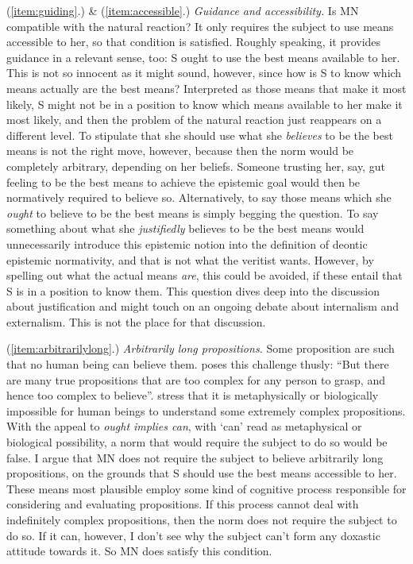 \documentclass[12pt,numbers=noenddot]{scrartcl}
\begin{document}
(\ref{item:guiding}.) \& (\ref{item:accessible}.) \emph{Guidance and accessibility.}
 Is MN compatible with the natural reaction? It only requires the subject to use means accessible to her, so that condition is satisfied. Roughly speaking, it provides guidance in a relevant sense, too: S ought to use the best means available to her. This is not so innocent as it might sound, however, since how is S to know which means actually are the best means? Interpreted as those means that make it most likely, S might not be in a position to know which means available to her make it most likely, and then the problem of the natural reaction just reappears on a different level. To stipulate that she should use what she \emph{believes} to be the best means is not the right move, however, because then the norm would be completely arbitrary, depending on her beliefs. Someone trusting her, say, gut feeling to be the best means to achieve the epistemic goal would then be normatively required to believe so. Alternatively, to say those means which she \emph{ought} to believe to be the best means is simply begging the question. To say something about what she \emph{justifiedly} believes to be the best means would unnecessarily introduce this epistemic notion into the definition of deontic epistemic normativity, and that is not what the veritist wants. However, by spelling out what the actual means \emph{are}, this could be avoided, if these entail that S is in a position to know them. This question dives deep into the discussion about justification and might touch on an ongoing debate about internalism and externalism. This is not the place for that discussion.

(\ref{item:arbitrarilylong}.) \emph{Arbitrarily long propositions.} 
Some proposition are such that no human being can believe them. \textcite[12]{Mchugh2012-MCHTTN} poses this challenge thusly: “But there are many true propositions that are too complex for any person to grasp, and hence too complex to believe”. \textcite[279]{Bykvist2007-BYKDTI} stress that it is metaphysically or biologically impossible for human beings to understand some extremely complex propositions. With the appeal to \emph{ought implies can}, with ‘can’ read as metaphysical or biological possibility, a norm that would require the subject to do so would be false. I argue that MN does not require the subject to believe arbitrarily long propositions, on the grounds that S should use the best means accessible to her. These means most plausible employ some kind of cognitive process responsible for considering and evaluating propositions. If this process cannot deal with indefinitely complex propositions, then the norm does not require the subject to do so. If it can, however, I don't see why the subject can't form any doxastic attitude towards it. So MN does satisfy this condition.
\end{document}
